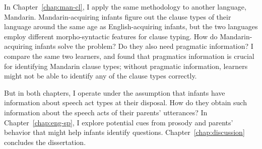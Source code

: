 In Chapter~\ref{chap:man-cl}, I apply the same methodology to another language, Mandarin. Mandarin-acquiring infants figure out the clause types of their language around the same age as English-acquiring infants, but the two languages employ different morpho-syntactic features for clause typing. How do Mandarin-acquiring infants solve the problem? Do they also need pragmatic information? I compare the same two learners, and found that pragmatics information is crucial for identifying Mandarin clause types; without pragmatic information, learners might not be able to identify any of the clause types correctly.

But in both chapters, I operate under the assumption that infants have information about speech act types at their disposal. How do they obtain such information about the speech acts of their parents' utterances? %
In Chapter~\ref{chap:eng-sp}, I explore potential cues from prosody and parents' behavior that might help infants identify questions. Chapter~\ref{chap:discussion} concludes the dissertation.

